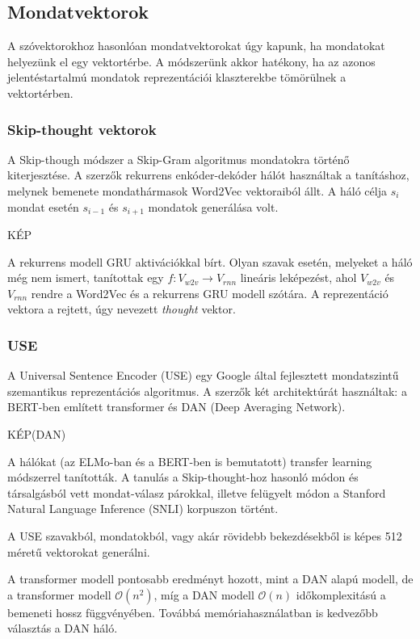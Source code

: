 \subsection{Mondatvektorok}
A szóvektorokhoz hasonlóan mondatvektorokat úgy kapunk, ha mondatokat helyezünk el egy vektortérbe. A módszerünk akkor hatékony, ha az azonos jelentéstartalmú mondatok reprezentációi klaszterekbe tömörülnek a vektortérben.


\subsubsection{Skip-thought vektorok}
A Skip-though módszer a Skip-Gram algoritmus mondatokra történő kiterjesztése. A szerzők rekurrens enkóder-dekóder hálót használtak a tanításhoz, melynek bemenete mondathármasok Word2Vec vektoraiból állt. A háló célja $s_i$ mondat esetén $s_{i-1}$ és $s_{i+1}$ mondatok generálása volt.

KÉP

A rekurrens modell GRU aktivációkkal bírt.
Olyan szavak esetén, melyeket a háló még nem ismert, tanítottak egy $f:V_{w2v} \rightarrow V_{rnn}$ lineáris leképezést, ahol $V_{w2v}$ és $V_{rnn}$ rendre a Word2Vec és a rekurrens GRU modell szótára. A reprezentáció vektora a rejtett, úgy nevezett \textit{thought} vektor.

\subsubsection{USE}
A Universal Sentence Encoder (USE) egy Google által fejlesztett mondatszintű szemantikus reprezentációs algoritmus. A szerzők két architektúrát használtak: a BERT-ben említett transformer és DAN (Deep Averaging Network). 

KÉP(DAN)

A hálókat (az ELMo-ban és a BERT-ben is bemutatott) transfer learning módszerrel tanították. A tanulás a Skip-thought-hoz hasonló módon és társalgásból vett mondat-válasz párokkal, illetve felügyelt módon a Stanford Natural Language Inference (SNLI) korpuszon történt.

A USE szavakból, mondatokból, vagy akár rövidebb bekezdésekből is képes 512 méretű vektorokat generálni.

A transformer modell pontosabb eredményt hozott, mint a DAN alapú modell, de a transformer modell $\mathcal{O}(n^2)$, míg a DAN modell $\mathcal{O}(n)$ időkomplexitású a bemeneti hossz függvényében. Továbbá memóriahasználatban is kedvezőbb választás a DAN háló.

